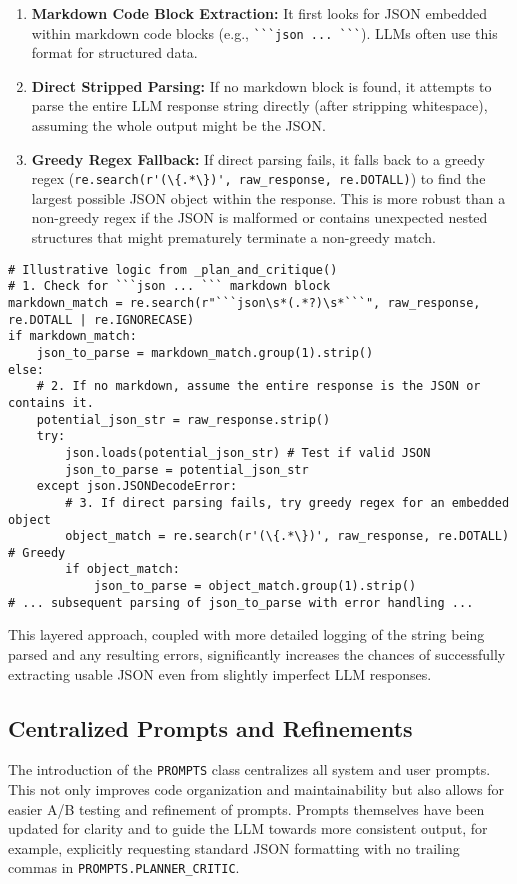 \documentclass[12pt, a4paper]{article}
\begin{document}
\begin{enumerate}
    \item \textbf{Markdown Code Block Extraction:} It first looks for JSON embedded within markdown code blocks (e.g., \verb|```json ... ```|). LLMs often use this format for structured data.
    \item \textbf{Direct Stripped Parsing:} If no markdown block is found, it attempts to parse the entire LLM response string directly (after stripping whitespace), assuming the whole output might be the JSON.
    \item \textbf{Greedy Regex Fallback:} If direct parsing fails, it falls back to a greedy regex (\verb|re.search(r'(\{.*\})', raw_response, re.DOTALL)|) to find the largest possible JSON object within the response. This is more robust than a non-greedy regex if the JSON is malformed or contains unexpected nested structures that might prematurely terminate a non-greedy match.
\end{enumerate}


\begin{lstlisting}[style=myPython]
# Illustrative logic from _plan_and_critique()
# 1. Check for ```json ... ``` markdown block
markdown_match = re.search(r"```json\s*(.*?)\s*```", raw_response, re.DOTALL | re.IGNORECASE)
if markdown_match:
    json_to_parse = markdown_match.group(1).strip()
else:
    # 2. If no markdown, assume the entire response is the JSON or contains it.
    potential_json_str = raw_response.strip()
    try:
        json.loads(potential_json_str) # Test if valid JSON
        json_to_parse = potential_json_str
    except json.JSONDecodeError:
        # 3. If direct parsing fails, try greedy regex for an embedded object
        object_match = re.search(r'(\{.*\})', raw_response, re.DOTALL) # Greedy
        if object_match:
            json_to_parse = object_match.group(1).strip()
# ... subsequent parsing of json_to_parse with error handling ...
\end{lstlisting}
This layered approach, coupled with more detailed logging of the string being parsed and any resulting errors, significantly increases the chances of successfully extracting usable JSON even from slightly imperfect LLM responses.

\subsection{Centralized Prompts and Refinements}
The introduction of the \verb|PROMPTS| class centralizes all system and user prompts. This not only improves code organization and maintainability but also allows for easier A/B testing and refinement of prompts. Prompts themselves have been updated for clarity and to guide the LLM towards more consistent output, for example, explicitly requesting standard JSON formatting with no trailing commas in \verb|PROMPTS.PLANNER_CRITIC|.
\end{document}
